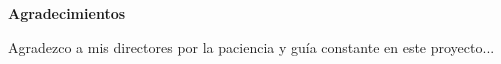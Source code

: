 \newpage
{\Large \bfseries Agradecimientos\par}
Agradezco a mis directores por la paciencia y guía constante en este proyecto...
